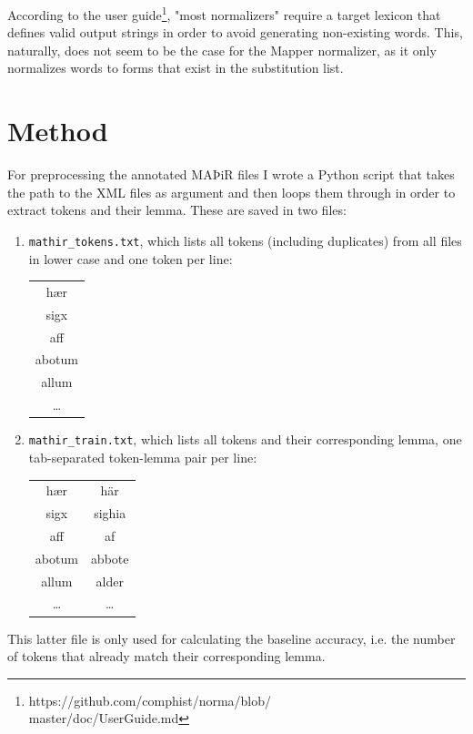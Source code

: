 \documentclass[11pt,a4paper]{article}
\begin{document}
According to the user guide\footnote{https://github.com/comphist/norma/blob/\\master/doc/UserGuide.md}, "most normalizers" require a target lexicon that defines valid output strings in order to avoid generating non-existing words. This, naturally, does not seem to be the case for the Mapper normalizer, as it only normalizes words to forms that exist in the substitution list. 

\section{Method}
For preprocessing the annotated MAÞiR files I wrote a Python script that takes the path to the XML files as argument and then loops them through in order to extract tokens and their lemma. These are saved in two files: 

\begin{enumerate}
   \item \texttt{mathir\_tokens.txt}, which lists all tokens (including duplicates) from all files in lower case and one token per line:
   \begin{table}[H]
    \centering
    \begin{tabular}{c}
       hær \\
       sigx \\
       aff \\
       abotum \\
       allum \\
       \ldots
    \end{tabular}
   \end{table}
    \item \texttt{mathir\_train.txt}, which lists all tokens and their corresponding lemma, one tab-separated token-lemma pair per line:
    
    \begin{table}[H]
    \centering
    \begin{tabular}{c|c}
        hær & här \\
        sigx & sighia \\
        aff & af \\
        abotum & abbote \\ 
        allum &	alder \\ 
        \ldots & \ldots
    \end{tabular}
    \end{table}
\end{enumerate}

This latter file is only used for calculating the baseline accuracy, i.e. the number of tokens that already match their corresponding lemma.
\end{document}
